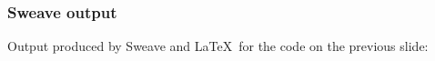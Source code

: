 \documentclass{beamer}
\begin{document}
\begin{frame}
  \frametitle{Sweave output}

Output produced by Sweave and \LaTeX\ for the code on the previous slide:


\begin{center}
\end{center}


\end{frame}
\end{document}
